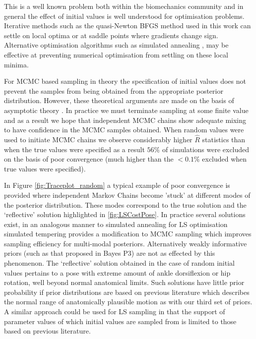 \documentclass{article}
\begin{document}
This is a well known problem both within the biomechanics community and in general the effect of initial values is well understood for optimisation problems.  Iterative methods such as the quasi-Newton BFGS method used in this work can settle on local optima or at saddle points where gradients change sign. Alternative optimisation algorithms such as simulated annealing \citep{bertsimas_simulated_1993}, may be effective at preventing numerical optimisation from settling on these local minima.

For MCMC based sampling in theory the specification of initial values does not prevent the samples from being obtained from the appropriate posterior distribution.  However, these theoretical arguments are made on the basis of asymptotic theory \citep{gilks_markov_1996}.  In practice we must terminate sampling at some finite value and as a result we hope that independent MCMC chains show adequate mixing to have confidence in the MCMC samples obtained. When random values were used to initiate MCMC chains we observe considerably higher $\hat{R}$ statistics \citep{brooks_general_1998} than when the true values were specified as a result $56\%$ of simulations were excluded on the basis of poor convergence (much higher than the $<0.1\%$ excluded when true values were specified).  

In Figure \ref{fig:Traceplot_random} a typical example of poor convergence is provided where independent Markov Chains become 'stuck' at different modes of the posterior distribution.  These modes correspond to the true solution and the `reflective' solution highlighted in \ref{fig:LSCostPose}.  In practice several solutions exist, in an analogous manner to simulated annealing for LS optimisation simulated tempering \citep{marinari_simulated_1992} provides a modification to MCMC sampling which improves sampling efficiency for multi-modal posteriors. Alternatively weakly informative priors (such as that proposed in Bayes P3) are not as effected by this phenomenon.  The `reflective' solution obtained in the case of random initial values pertains to a pose with extreme amount of ankle dorsiflexion or hip rotation, well beyond normal anatomical limits.  Such solutions have little prior probability if prior distributions are based on previous literature which describes the normal range of anatomically plausible motion as with our third set of priors.  A similar approach could be used for LS sampling in that the support of parameter values of which initial values are sampled from is limited to those based on previous literature.
\end{document}
